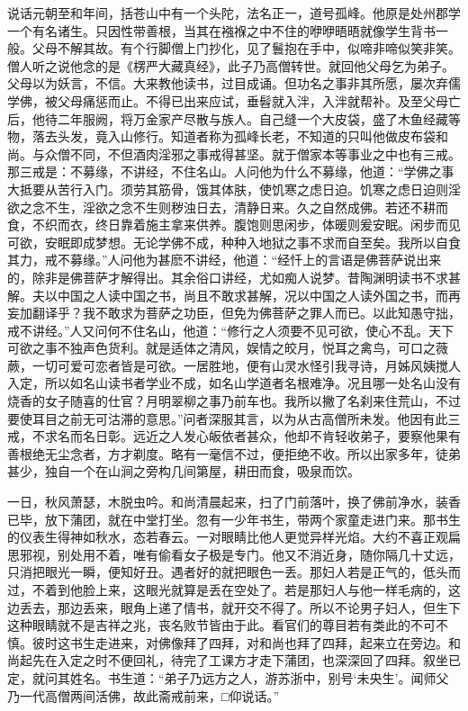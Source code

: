 \documentclass[a4paper,12pt,UTF8,twoside]{ctexbook}
\begin{document}
说话元朝至和年间，括苍山中有一个头陀，法名正一，道号孤峰。他原是处州郡学一个有名诸生。只因性带善根，当其在襁褓之中不住的咿咿晤晤就像学生背书一般。父母不解其故。有个行脚僧上门抄化，见了鬟抱在手中，似啼非啼似笑非笑。僧人听之说他念的是《楞严大藏真经》，此子乃高僧转世。就回他父母乞为弟子。父母以为妖言，不信。大来教他读书，过目成诵。但功名之事非其所愿，屡次弃儒学佛，被父母痛惩而止。不得已出来应试，垂髫就入泮，入泮就帮补。及至父母亡后，他待二年服阙，将万金家产尽散与族人。自己缝一个大皮袋，盛了木鱼经藏等物，落去头发，竟入山修行。知道者称为孤峰长老，不知道的只叫他做皮布袋和尚。与众僧不同，不但酒肉淫邪之事戒得甚坚。就于僧家本等事业之中也有三戒。那三戒是：不募缘，不讲经，不住名山。人问他为什么不募缘，他道：“学佛之事大抵要从苦行入门。须劳其筋骨，饿其体肤，使饥寒之虑日迫。饥寒之虑日迫则淫欲之念不生，淫欲之念不生则秽浊日去，清静日来。久之自然成佛。若还不耕而食，不织而衣，终日靠着施主拿来供养。腹饱则思闲步，体暖则爰安眠。闲步而见可欲，安眠即成梦想。无论学佛不成，种种入地狱之事不求而自至矣。我所以自食其力，戒不募缘。”人问他为甚麽不讲经，他道：“经忏上的言语是佛菩萨说出来的，除非是佛菩萨才解得出。其余俗口讲经，尤如痴人说梦。昔陶渊明读书不求甚解。夫以中国之人读中国之书，尚且不敢求甚解，况以中国之人读外国之书，而再妄加翻译乎？我不敢求为菩萨之功臣，但免为佛菩萨之罪人而已。以此知愚守拙，戒不讲经。”人又问何不住名山，他道：“修行之人须要不见可欲，使心不乱。天下可欲之事不独声色货利。就是适体之清风，娱情之皎月，悦耳之禽鸟，可口之薇蕨，一切可爱可恋者皆是可欲。一居胜地，便有山灵水怪引我寻诗，月姊风姨搅人入定，所以如名山读书者学业不成，如名山学道者名根难净。况且哪一处名山没有烧香的女子随喜的仕官？月明翠柳之事乃前车也。我所以撇了名刹来住荒山，不过要使耳目之前无可沽滞的意思。”问者深服其言，以为从古高僧所未发。他因有此三戒，不求名而名日彰。远近之人发心皈依者甚众，他却不肯轻收弟子，要察他果有善根绝无尘念者，方才剃度。略有一毫信不过，便拒绝不收。所以出家多年，徒弟甚少，独自一个在山涧之旁构几间第屋，耕田而食，吸泉而饮。

一日，秋风萧瑟，木脱虫吟。和尚清晨起来，扫了门前落叶，换了佛前净水，装香已毕，放下蒲团，就在中堂打坐。忽有一少年书生，带两个家童走进门来。那书生的仪表生得神如秋水，态若春云。一对眼睛比他人更觉异样光焰。大约不喜正观扁思邪视，别处用不着，唯有偷看女子极是专门。他又不消近身，随你隔几十丈远，只消把眼光一瞬，便知好丑。遇者好的就把眼色一丢。那妇人若是正气的，低头而过，不着到他脸上来，这眼光就算是丢在空处了。若是那妇人与他一样毛病的，这边丢去，那边丢来，眼角上递了情书，就开交不得了。所以不论男子妇人，但生下这种眼睛就不是吉祥之兆，丧名败节皆由于此。看官们的尊目若有类此的不可不慎。彼时这书生走进来，对佛像拜了四拜，对和尚也拜了四拜，起来立在旁边。和尚起先在入定之时不便回礼，待完了工课方才走下蒲团，也深深回了四拜。叙坐已定，就问其姓名。书生道：“弟子乃远方之人，游苏浙中，别号‘未央生’。闻师父乃一代高僧两间活佛，故此斋戒前来，□仰说话。”
\end{document}
